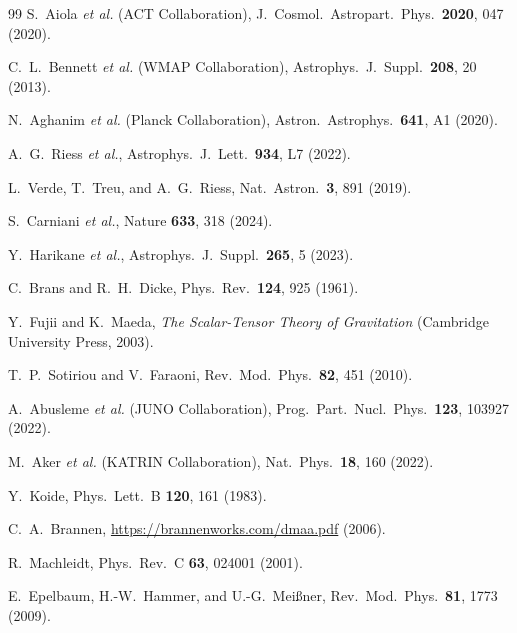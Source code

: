 \documentclass[aps,prd,twocolumn,superscriptaddress,nofootinbib,longbibliography]{revtex4-2}
\begin{document}
\begin{thebibliography}{99}
S.~Aiola \textit{et al.} (ACT Collaboration),
J.\ Cosmol.\ Astropart.\ Phys.\ \textbf{2020}, 047 (2020).

C.~L.~Bennett \textit{et al.} (WMAP Collaboration),
Astrophys.\ J.\ Suppl.\ \textbf{208}, 20 (2013).

N.~Aghanim \textit{et al.} (Planck Collaboration),
Astron.\ Astrophys.\ \textbf{641}, A1 (2020).


A.~G.~Riess \textit{et al.},
Astrophys.\ J.\ Lett.\ \textbf{934}, L7 (2022).

L.~Verde, T.~Treu, and A.~G.~Riess,
Nat.\ Astron.\ \textbf{3}, 891 (2019).


S.~Carniani \textit{et al.},
Nature \textbf{633}, 318 (2024).

Y.~Harikane \textit{et al.},
Astrophys.\ J.\ Suppl.\ \textbf{265}, 5 (2023).


C.~Brans and R.~H.~Dicke,
Phys.\ Rev.\ \textbf{124}, 925 (1961).

Y.~Fujii and K.~Maeda,
\textit{The Scalar-Tensor Theory of Gravitation}
(Cambridge University Press, 2003).

T.~P.~Sotiriou and V.~Faraoni,
Rev.\ Mod.\ Phys.\ \textbf{82}, 451 (2010).


A.~Abusleme \textit{et al.} (JUNO Collaboration),
Prog.\ Part.\ Nucl.\ Phys.\ \textbf{123}, 103927 (2022).

M.~Aker \textit{et al.} (KATRIN Collaboration),
Nat.\ Phys.\ \textbf{18}, 160 (2022).


Y.~Koide,
Phys.\ Lett.\ B \textbf{120}, 161 (1983).

C.~A.~Brannen,
\url{https://brannenworks.com/dmaa.pdf} (2006).


R.~Machleidt,
Phys.\ Rev.\ C \textbf{63}, 024001 (2001).

E.~Epelbaum, H.-W.~Hammer, and U.-G.~Mei{\ss}ner,
Rev.\ Mod.\ Phys.\ \textbf{81}, 1773 (2009).


\end{thebibliography}
\end{document}
